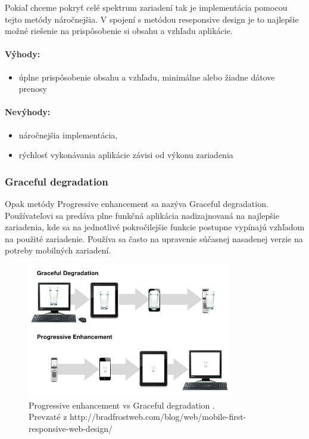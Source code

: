Pokiaľ chceme pokryť celé spektrum zariadení tak je implementácia pomocou tejto metódy náročnejšia. V spojení s metódou reseponsive design je to najlepšie možné riešenie na prispôsobenie si obsahu a vzhľadu aplikácie.

\paragraph{Výhody:}
\begin{itemize}
	\item úplne prispôsobenie obsahu a vzhľadu, minimálne alebo žiadne dátove prenosy
\end{itemize}

\paragraph{Nevýhody:}
\begin{itemize}
	\item náročnejšia implementácia, 
	\item rýchlosť vykonávania aplikácie závisi od výkonu zariadenia
\end{itemize}


\subsubsection{Graceful degradation} %
\label{ssub:graceful_degradation}

Opak metódy Progressive enhancement sa nazýva Graceful degradation. Používateľovi sa predáva plne funkčná aplikácia nadizajnovaná na najlepšie zariadenia, kde sa na jednotlivé pokročilejšie funkcie postupne vypínajú vzhľadom na použité zariadenie. Používa sa často na upravenie súčasnej nasadenej verzie na potreby mobilných zariadení.

\begin{figure}[H]
	\centering
	\includegraphics[width=0.8\textwidth]{img/PEvsGD.jpg}
	\caption[Progressive enhancement vs Graceful degradation]{
		Progressive enhancement vs Graceful degradation \cite{adaptivesxsw}.\\
		Prevzaté z http://bradfrostweb.com/blog/web/mobile-first-responsive-web-design/}
	\label{fig: gd}
\end{figure}

